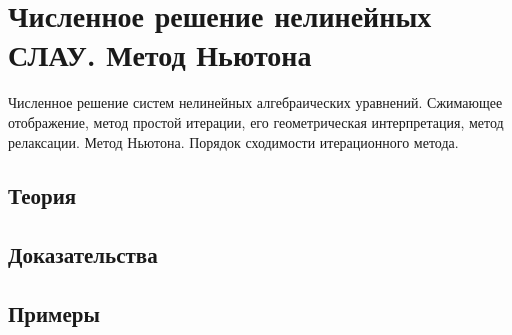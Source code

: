 
\section{Численное решение нелинейных СЛАУ. Метод Ньютона}
\label{sec:2.1.08-nonlinear-systems}

\begin{ticket}
Численное решение систем нелинейных алгебраических уравнений. Сжимающее отображение, метод простой итерации, его геометрическая интерпретация, метод релаксации. Метод Ньютона. Порядок сходимости итерационного метода.
\end{ticket}

\subsection*{Теория}

\subsection*{Доказательства}

\subsection*{Примеры}
